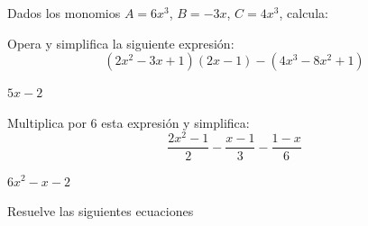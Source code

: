 \documentclass[addpoints,spanish, 12pt,a4paper]{exam}
\begin{document}
\begin{questions}

\question Dados los monomios $A=6x^3$, $B=-3x$, $C=4x^3$, calcula:
\addpoints


\question [2] Opera y simplifica la siguiente expresión: $$\left(2x^2-3x+1\right)\left(2x-1\right)-\left(4x^3-8x^2+1\right) $$
\begin{solution}
$5x-2$
\end{solution}

\question [2] Multiplica por 6 esta expresión y simplifica: $$\dfrac{2x^2-1}{2}-\dfrac{x-1}{3}-\dfrac{1-x}{6}$$
\begin{solution}
$ 6x^2-x-2$
\end{solution}

\question Resuelve las siguientes ecuaciones

\end{questions}
\end{document}
